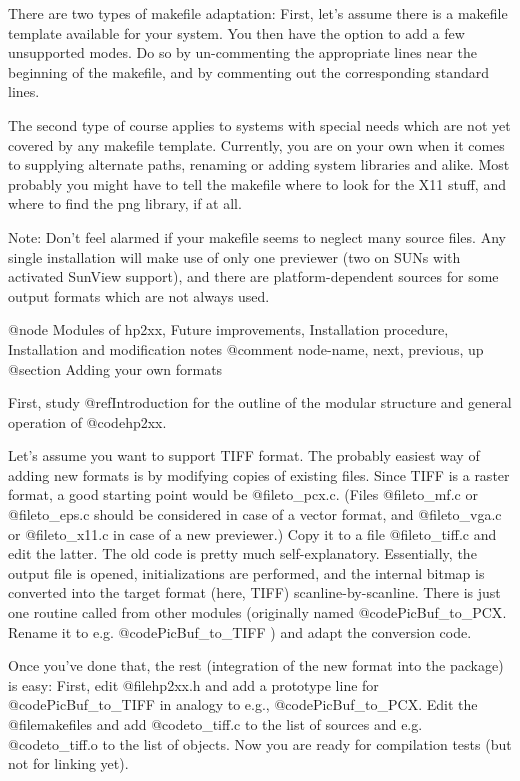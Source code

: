 There are two types of makefile adaptation: First, let's assume there
is a makefile template available for your system. You then have the option to
add a few unsupported modes. Do so by un-commenting the appropriate lines
near the beginning of the makefile, and by commenting out the corresponding
standard lines.

The second type of course applies to systems with special needs which are not
yet covered by any makefile template. Currently, you are on your own when
it comes to supplying alternate paths, renaming or adding system libraries
and alike. Most probably you might have to tell the makefile where to
look for the X11 stuff, and where to find the png library, if at all.

Note: Don't feel alarmed if your makefile seems to neglect many source files.
Any single installation will make use of only one previewer (two on
SUNs with activated SunView support), and there are platform-dependent
sources for some output formats which are not always used.




@node Modules of hp2xx, Future improvements, Installation procedure, Installation and modification notes
@comment  node-name,  next,  previous,  up
@section Adding your own formats

First, study @ref{Introduction} for the outline of the modular structure and
general operation of @code{hp2xx}.

Let's assume you want to support TIFF format. The probably easiest way
of adding new formats is by modifying copies of existing files. Since TIFF
is a raster format, a good starting point would be @file{to_pcx.c}.
(Files @file{to_mf.c} or @file{to_eps.c} should be considered in case
of a vector format, and @file{to_vga.c} or @file{to_x11.c} in case of
a new previewer.) Copy it to a file @file{to_tiff.c} and edit the latter.
The old code is pretty much self-explanatory. Essentially, the output file
is opened, initializations are performed, and the internal bitmap is
converted into the target format (here, TIFF) scanline-by-scanline.
There is just one routine called from other modules (originally named
@code{PicBuf_to_PCX}. Rename it to e.g. @code{PicBuf_to_TIFF} ) and adapt
the conversion code.

Once you've done that, the rest (integration of the new format into the
package) is easy: First, edit @file{hp2xx.h} and add a prototype
line for @code{PicBuf_to_TIFF} in analogy to e.g., @code{PicBuf_to_PCX}.
Edit the @file{makefile}s and add @code{to_tiff.c} to the list of sources
and e.g. @code{to_tiff.o} to the list of objects. Now you are ready for
compilation tests (but not for linking yet).

